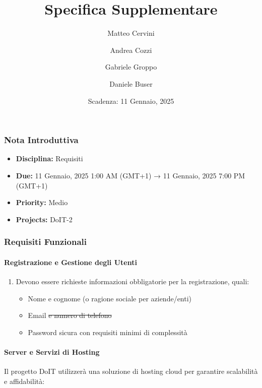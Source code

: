 \title{Specifica Supplementare}
\author{Matteo Cervini \and Andrea Cozzi \and Gabriele Groppo \and Daniele Buser}
\date{Scadenza: 11 Gennaio, 2025}

\maketitle

\subsubsection{Nota Introduttiva}
\begin{itemize}
\item \textbf{Disciplina:} Requisiti
\item \textbf{Due:} 11 Gennaio, 2025 1:00 AM (GMT+1) → 11 Gennaio, 2025 7:00 PM (GMT+1)
\item \textbf{Priority:} Medio
\item \textbf{Projects:} DoIT-2
\end{itemize}

\subsubsection{Requisiti Funzionali}

\paragraph{Registrazione e Gestione degli Utenti}

\begin{enumerate}
    \item Devono essere richieste informazioni obbligatorie per la registrazione, quali:
    \begin{itemize}
        \item Nome e cognome (o ragione sociale per aziende/enti)
        \item Email \sout{e numero di telefono}
        \item Password sicura con requisiti minimi di complessità
    \end{itemize}
\end{enumerate}

\paragraph{Server e Servizi di Hosting}

Il progetto DoIT utilizzerà una soluzione di hosting cloud per garantire scalabilità e affidabilità:

